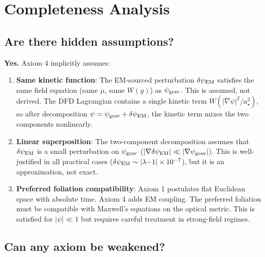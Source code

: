 \documentclass[11pt]{article}
\newcommand{\psigrav}{\psi_{\rm grav}}
\newcommand{\dpsiEM}{\delta\psi_{\rm EM}}
\newcommand{\lambdaone}{|\lambda{-}1|}
\newcommand{\mufd}{\mu}
\begin{document}
\section{Completeness Analysis}

\subsection{Are there hidden assumptions?}

\textbf{Yes.} Axiom 4 implicitly assumes:

\begin{enumerate}[label=(\alph*)]
\item \textbf{Same kinetic function}: The EM-sourced perturbation
  $\dpsiEM$ satisfies the same field equation (same $\mufd$, same
  $W(y)$) as $\psigrav$. This is assumed, not derived. The DFD
  Lagrangian contains a single kinetic term $W(|\nabla\psi|^2/a_\star^2)$,
  so after decomposition $\psi = \psigrav + \dpsiEM$, the kinetic term
  mixes the two components nonlinearly.

\item \textbf{Linear superposition}: The two-component decomposition
  assumes that $\dpsiEM$ is a small perturbation on $\psigrav$
  ($|\nabla\dpsiEM| \ll |\nabla\psigrav|$). This is well-justified in
  all practical cases ($\dpsiEM \sim \lambdaone \times 10^{-7}$), but
  it is an approximation, not exact.

\item \textbf{Preferred foliation compatibility}: Axiom 1 postulates
  flat Euclidean space with absolute time. Axiom 4 adds EM coupling.
  The preferred foliation must be compatible with Maxwell's equations
  on the optical metric. This is satisfied for $|\psi| \ll 1$ but
  requires careful treatment in strong-field regimes.
\end{enumerate}

\subsection{Can any axiom be weakened?}
\end{document}
